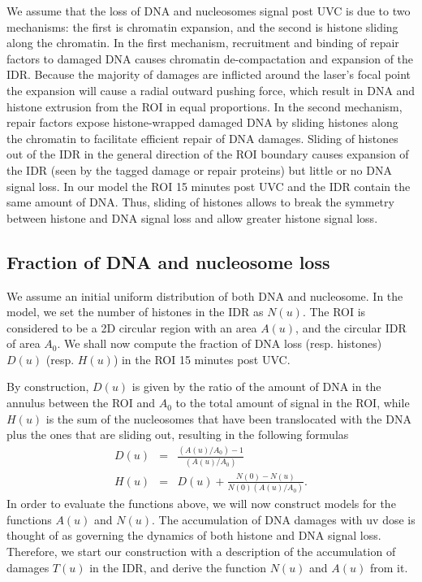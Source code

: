 \documentclass[12pt]{article}
\begin{document}
We assume that the loss of DNA and nucleosomes signal post UVC is due to two mechanisms: the first is chromatin expansion, and the second is histone sliding along the chromatin. In the first mechanism, recruitment and binding of repair factors to damaged DNA causes chromatin de-compactation and expansion of the IDR. Because the majority of damages are inflicted around the laser's focal point the expansion will cause a radial outward pushing force, which result in DNA and histone extrusion from the ROI in equal proportions. In the second mechanism, repair factors expose histone-wrapped damaged DNA by sliding histones along the chromatin to facilitate efficient repair of DNA damages. Sliding of histones out of the IDR in the general direction of the ROI boundary causes expansion of the IDR (seen by the tagged damage or repair proteins) but little or no DNA signal loss. In our model the ROI 15 minutes post UVC and the IDR contain the same amount of DNA. Thus, sliding of histones allows to break the symmetry between histone and DNA signal loss and allow greater histone signal loss. 

\subsection{Fraction of DNA and nucleosome loss }\label{subsection:fractionOfDNAandNucleosomeLoss}
We assume an initial uniform distribution of both DNA and nucleosome. 
In the model, we set the number of histones in the IDR as $N(u)$. The ROI is considered to be a 2D circular region with an area $A(u)$, and the circular IDR of area $A_0$. 
We shall now compute the fraction of DNA loss (resp. histones) $D(u)$ (resp. $H(u)$) in the ROI 15 minutes post UVC. 

By construction, $D(u)$ is given by the ratio of the amount of DNA in the annulus between the ROI and $A_0$ to the total amount of signal in the ROI, while $H(u)$ is the sum of the nucleosomes that have been translocated with the DNA plus the ones that are sliding out, resulting in the following formulas
\begin{eqnarray}
D(u)&=& \frac{(A(u)/A_0) -1}{(A(u)/A_0)} \\
H(u)&=&D(u)+\frac{N(0)-N(u)}{N(0)(A(u)/A_0)}.
\end{eqnarray}
In order to evaluate the functions above, we will now construct models for the functions $A(u)$ and $N(u)$. The accumulation of DNA damages with uv dose is thought of as governing the dynamics of both histone and DNA signal loss. Therefore, we start our construction with a description of the accumulation of damages $T(u)$ in the IDR, and derive the function $N(u)$ and $A(u)$ from it.
\end{document}
